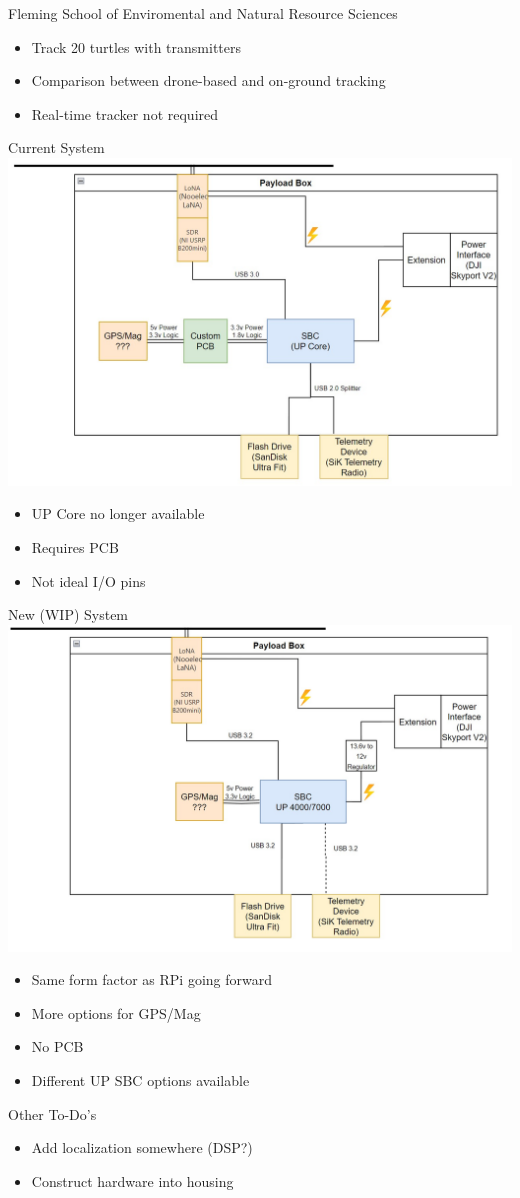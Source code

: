 \begin{frame}{Fleming School of Enviromental and Natural Resource Sciences}
    \begin{itemize}
        \item Track 20 turtles with transmitters
        \item Comparison between drone-based and on-ground tracking
        \item Real-time tracker not required
    \end{itemize}
\end{frame}
\begin{frame}{Current System}
    \centering
    \includegraphics[height=.6\textheight,width=.6\textwidth,keepaspectratio]{images/rtt/oldSystem.jpg}
    \begin{itemize}
        \item UP Core no longer available
        \item Requires PCB
        \item Not ideal I/O pins
    \end{itemize}
\end{frame}
\begin{frame}{New (WIP) System}
    \centering
    \includegraphics[height=.6\textheight,width=.6\textwidth,keepaspectratio]{images/rtt/NewSystem.jpg}
    \begin{itemize}
        \item Same form factor as RPi going forward
        \item More options for GPS/Mag
        \item No PCB
        \item Different UP SBC options available
    \end{itemize}
\end{frame}
\begin{frame}{Other To-Do's}
    \begin{itemize}
        \item Add localization somewhere (DSP?)
        \item Construct hardware into housing
    \end{itemize}
\end{frame}
